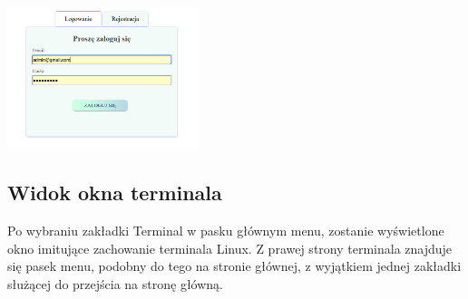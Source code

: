 \documentclass[10pt,a4paper]{report}
\begin{document}
\begin{adjustwidth}{2cm}{2cm}
\begin{multicols}{2}
\begin{minipage}{\linewidth}
  \includegraphics[width=210px]{project/logowanie.png}
\end{minipage}
\end{multicols}
\subsection{Widok okna terminala}
\begin{minipage}{1\linewidth}
Po wybraniu zakładki Terminal w pasku głównym menu, zostanie wyświetlone okno imitujące zachowanie terminala Linux.
Z prawej strony terminala znajduje się pasek menu, podobny do tego na stronie głównej, z wyjątkiem jednej zakładki służącej do przejścia na stronę główną. \\
\end{minipage}


\end{adjustwidth}
\end{document}
